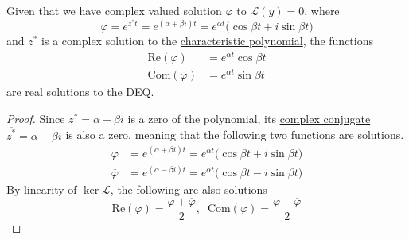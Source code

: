 \documentclass{article}
\begin{document}
      \begin{lemma}
        \label{thm:real-and-imaginary-parts-of-a-complex-solution}
      Given that we have complex valued solution $\varphi$ to $\mathcal{L}(y) = 0$, where
      \begin{equation}
        \varphi = e^{z^* t} = e^{(\alpha + \beta i) t} = e^{\alpha t} \big(\cos{\beta t} + i \sin{\beta t}\big)
      \end{equation}
      and $z^*$ is a complex solution to the \hyperref[def:characteristic-polynomial]{characteristic polynomial}, the functions 
      \begin{align*}
          \text{Re}(\varphi) & = e^{\alpha t} \cos{\beta t} \\
          \text{Com}(\varphi) & = e^{\alpha t} \sin{\beta t} 
      \end{align*}
      are real solutions to the DEQ. 
      \end{lemma}
      \begin{proof}
      Since $z^* = \alpha + \beta i$ is a zero of the polynomial, its \hyperref[cx-def:complex-conjugate]{complex conjugate} $\overline{z^*} = \alpha - \beta i$ is also a zero, meaning that the following two functions are solutions. 
      \begin{align*}
          \varphi & = e^{(\alpha + \beta i)t} = e^{\alpha t} \big( \cos{\beta t} + i \sin{\beta t}\big) \\
          \overline{\varphi} & = e^{(\alpha - \beta i)t} = e^{\alpha t} \big(\cos{\beta t} - i \sin{\beta t}\big) 
      \end{align*}
      By linearity of $\ker{\mathcal{L}}$, the following are also solutions
      \begin{equation}
        \text{Re}(\varphi) = \frac{\varphi + \overline{\varphi}}{2}, \;\; \text{Com}(\varphi) = \frac{\varphi - \overline{\varphi}}{2}
      \end{equation}
      \end{proof}
\end{document}
